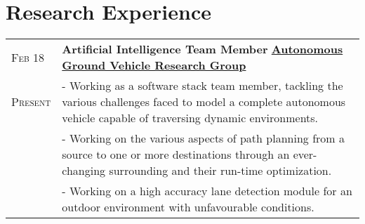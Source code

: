 \documentclass[a4paper,10pt]{extarticle} %
\begin{document}
\section{\textcolor{primary}{Research Experience}}
\begin{tabularx}{\linewidth}{ l | X }
\textsc{Feb 18} & \textbf{Artificial Intelligence Team Member} \hfill\href{http://www.agv.iitkgp.ac.in/}{\textbf{Autonomous Ground Vehicle Research Group}}\\
\textsc{Present} & {- Working as a software stack team member, tackling the various challenges faced to model a complete autonomous vehicle capable of traversing dynamic environments.}\\
& {- Working on the various aspects of path planning from a source to one or more destinations through an ever-changing surrounding  and their run-time optimization.}\\
& {- Working on a high accuracy lane detection module for an outdoor environment with unfavourable conditions.}
\end{tabularx}


\vspace{-0.1cm}
\end{document}
